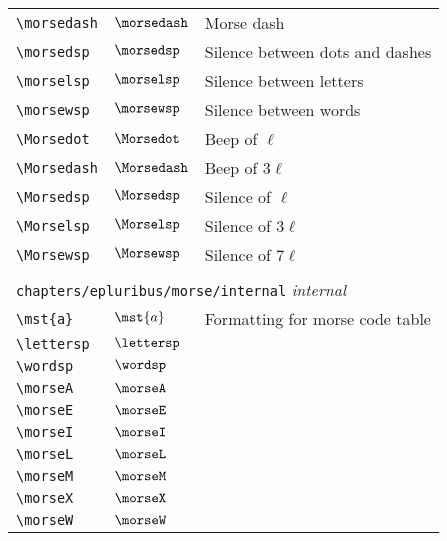 \begin{longtable}{lll}
 {\color[rgb]{0.5,0.5,0.5}\texttt{\textbackslash morsedash}} & $\morsedash$ &  Morse dash\\ 
 {\color[rgb]{0.5,0.5,0.5}\texttt{\textbackslash morsedsp}} & $\morsedsp$ &  Silence between dots and dashes\\ 
 {\color[rgb]{0.5,0.5,0.5}\texttt{\textbackslash morselsp}} & $\morselsp$ &  Silence between letters\\ 
 {\color[rgb]{0.5,0.5,0.5}\texttt{\textbackslash morsewsp}} & $\morsewsp$ &  Silence between words\\ 
 {\color[rgb]{0.5,0.5,0.5}\texttt{\textbackslash Morsedot}} & $\Morsedot$ &  Beep of $\ell$\\ 
 {\color[rgb]{0.5,0.5,0.5}\texttt{\textbackslash Morsedash}} & $\Morsedash$ &  Beep of $3\ell$\\ 
 {\color[rgb]{0.5,0.5,0.5}\texttt{\textbackslash Morsedsp}} & $\Morsedsp$ &  Silence of $\ell$\\ 
 {\color[rgb]{0.5,0.5,0.5}\texttt{\textbackslash Morselsp}} & $\Morselsp$ &  Silence of $3\ell$\\ 
 {\color[rgb]{0.5,0.5,0.5}\texttt{\textbackslash Morsewsp}} & $\Morsewsp$ &  Silence of $7\ell$\\ 
  &  & \\ 
 \multicolumn{3}{l}{{\color[rgb]{0.5,0.5,0.5}\texttt{chapters/epluribus/morse/internal}} \emph{internal}}\\ 
 \hline
{\color[rgb]{0.5,0.5,0.5}\texttt{\textbackslash mst\{a\}}} & $\mst{a}$ &  Formatting for morse code table\\ 
 {\color[rgb]{0.5,0.5,0.5}\texttt{\textbackslash lettersp}} & $\lettersp$ & \\ 
 {\color[rgb]{0.5,0.5,0.5}\texttt{\textbackslash wordsp}} & $\wordsp$ & \\ 
 {\color[rgb]{0.5,0.5,0.5}\texttt{\textbackslash morseA}} & $\morseA$ & \\ 
 {\color[rgb]{0.5,0.5,0.5}\texttt{\textbackslash morseE}} & $\morseE$ & \\ 
 {\color[rgb]{0.5,0.5,0.5}\texttt{\textbackslash morseI}} & $\morseI$ & \\ 
 {\color[rgb]{0.5,0.5,0.5}\texttt{\textbackslash morseL}} & $\morseL$ & \\ 
 {\color[rgb]{0.5,0.5,0.5}\texttt{\textbackslash morseM}} & $\morseM$ & \\ 
 {\color[rgb]{0.5,0.5,0.5}\texttt{\textbackslash morseX}} & $\morseX$ & \\ 
 {\color[rgb]{0.5,0.5,0.5}\texttt{\textbackslash morseW}} & $\morseW$ & \\ 

\end{longtable}
